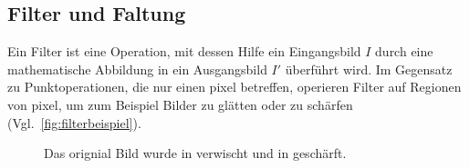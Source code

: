 % 	
% 

\subsection{Filter und Faltung} %
\label{sub:filter}
Ein Filter ist eine Operation, mit dessen Hilfe ein Eingangsbild $I$ durch eine mathematische Abbildung in ein
 Ausgangsbild $I'$ überführt wird. Im Gegensatz zu Punktoperationen, die nur einen \gls{pixel} betreffen, operieren
 Filter auf Regionen von \gls{pixel}, um zum Beispiel Bilder zu glätten oder zu schärfen
 (Vgl.~\autoref{fig:filterbeispiel}).
\begin{figure}[!ht]
	\centering
	\caption{Das orignial Bild  wurde in
	  verwischt und in  geschärft.}
	\label{fig:filterbeispiel}
\end{figure}

